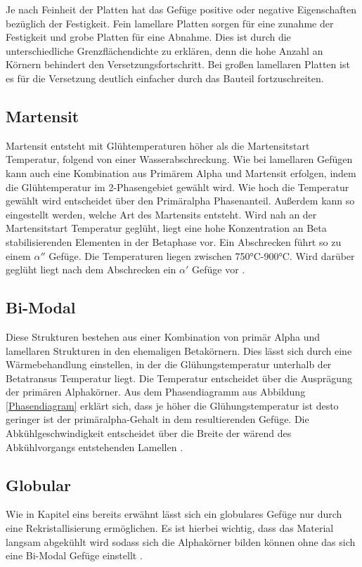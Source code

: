 \documentclass[a4paper, 11pt]{tubsreprt}
\begin{document}
Je nach Feinheit der Platten hat das Gefüge positive oder negative Eigenschaften bezüglich der Festigkeit. Fein lamellare Platten sorgen für eine zunahme der Festigkeit und grobe Platten für eine Abnahme. Dies ist durch die unterschiedliche Grenzflächendichte zu erklären, denn die hohe Anzahl an Körnern behindert den Versetzungsfortschritt. Bei großen lamellaren Platten ist es für die Versetzung deutlich einfacher durch das Bauteil fortzuschreiten. 

\subsection{Martensit}
Martensit entsteht mit Glühtemperaturen höher als die Martensitstart Temperatur, folgend von einer Wasserabschreckung. Wie bei lamellaren Gefügen kann auch eine Kombination aus Primärem Alpha und Martensit erfolgen, indem die Glühtemperatur im 2-Phasengebiet gewählt wird. Wie hoch die Temperatur gewählt wird entscheidet über den Primäralpha Phasenanteil. Außerdem kann so eingestellt werden, welche Art des Martensits entsteht. Wird nah an der Martensitstart Temperatur geglüht, liegt eine hohe Konzentration an Beta stabilisierenden Elementen in der Betaphase vor. Ein Abschrecken führt so zu einem $\alpha''$ Gefüge. Die Temperaturen liegen zwischen 750°C-900°C. Wird darüber geglüht liegt nach dem Abschrecken ein $\alpha'$ Gefüge vor \cite{Boyer1994}.

\subsection{Bi-Modal}
Diese Strukturen bestehen aus einer Kombination von primär Alpha und lamellaren Strukturen in den ehemaligen Betakörnern. Dies lässt sich durch eine Wärmebehandlung einstellen, in der die Glühungstemperatur unterhalb der Betatransus Temperatur liegt. Die Temperatur entscheidet über die Ausprägung der primären Alphakörner. Aus dem Phasendiagramm aus Abbildung \ref{Phasendiagram} erklärt sich, dass je höher die Glühungstemperatur ist desto geringer ist der primäralpha-Gehalt in dem resultierenden Gefüge. Die Abkühlgeschwindigkeit entscheidet über die Breite der wärend des Abkühlvorgangs entstehenden Lamellen \cite{Luetjering2007}.

\subsection{Globular}
Wie in Kapitel eins bereits erwähnt lässt sich ein globulares Gefüge nur durch eine Rekristallisierung ermöglichen. Es ist hierbei wichtig, dass das Material langsam abgekühlt wird sodass sich die Alphakörner bilden können ohne das sich eine Bi-Modal Gefüge einstellt \cite{Luetjering2007}.
\end{document}
